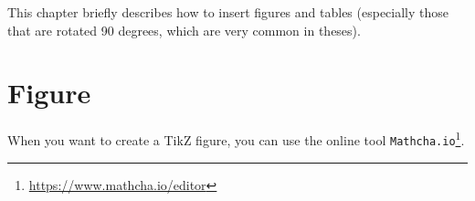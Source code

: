 This chapter briefly describes how to insert figures and tables (especially those that are rotated 90 degrees, which are very common in theses).

\section{Figure}
When you want to create a TikZ figure, you can use the online tool \texttt{Mathcha.io}\footnote{\url{https://www.mathcha.io/editor}}.


\begin{figure}
\centering
{} %
\begin{tikzpicture}[x=0.75pt,y=0.75pt,yscale=-1,xscale=1]



\end{tikzpicture}
\end{figure}
